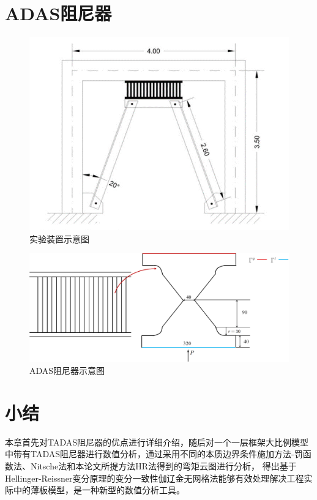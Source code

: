 \section{ADAS阻尼器}
\begin{figure}[H]
    \centering
    \includegraphics[scale=0.6]{figure/DAMPER/ADAS/1.png}
    \caption{实验装置示意图}
\end{figure}
\begin{figure}[H]
    \centering
    \includegraphics[scale=0.5]{figure/DAMPER/ADAS/2.png}
    \caption{ADAS阻尼器示意图}
\end{figure}
\section{小结}
本章首先对TADAS阻尼器的优点进行详细介绍，随后对一个一层框架大比例模型中带有TADAS阻尼器进行数值分析，通过采用不同的本质边界条件施加方法-罚函数法、Nitsche法和本论文所提方法HR法得到的弯矩云图进行分析，
得出基于Hellinger-Reissner变分原理的变分一致性伽辽金无网格法能够有效处理解决工程实际中的薄板模型，是一种新型的数值分析工具。


